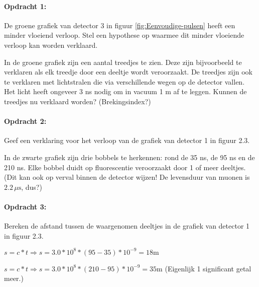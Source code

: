 \begin{minipage}[t]{1\columnwidth}%

\paragraph{Opdracht 1:}

De groene grafiek van detector 3 in figuur \ref{fig:Eenvoudige-pulsen}
heeft een minder vloeiend verloop. Stel een hypothese op waarmee dit
minder vloeiende verloop kan worden verklaard.

In de groene grafiek zijn een aantal treedjes te zien. Deze zijn bijvoorbeeld
te verklaren als elk treedje door een deeltje wordt veroorzaakt.
De treedjes zijn ook te verklaren met lichtstralen die via verschillende
wegen op de detector vallen. Het licht heeft ongeveer 3 ns nodig om
in vacuum 1 m af te leggen. Kunnen de treedjes nu verklaard worden?
(Brekingsindex?)

\end{minipage}

\begin{minipage}[t]{1\columnwidth}%

\paragraph{Opdracht 2:}

Geef een verklaring voor het verloop van de grafiek van detector
1 in figuur 2.3.


In de zwarte grafiek zijn drie bobbels te herkennen: rond de 35 ns,
de 95 ns en de 210 ns. Elke bobbel duidt op fluorescentie veroorzaakt
door 1 of meer deeltjes. (Dit kan ook op verval binnen de detector
wijzen! De levensduur van muonen is $2.2 \, \mu\mathrm{s}$, dus?)

\end{minipage}

\begin{minipage}[t]{1\columnwidth}%

\paragraph{Opdracht 3:}

Bereken de afstand tussen de waargenomen deeltjes in de grafiek
van detector 1 in figuur 2.3.

$s=c*t\Rightarrow s=3.0*10^{8}*\left(95-35\right)*10^{-9}=18\mathrm{m}$

$s=c*t\Rightarrow s=3.0*10^{8}*\left(210-95\right)*10^{-9}=35\mathrm{m}$
(Eigenlijk 1 significant getal meer.)
\end{minipage}


